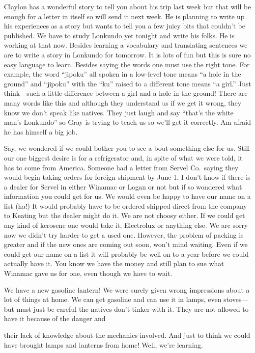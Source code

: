 \documentclass[
]{book}
\begin{document}
Claylon has a wonderful story to tell you about his trip last week but that will be enough for a letter in itself so will send it next week. He is planning to write up his experiences as a story but wants to tell you a few juicy bits that couldn't be published. We have to study Lonkundo yet tonight and write his folks. He is working at that now. Besides learning a vocabulary and translating sentences we are to write a story in Lonkundo for tomorrow. It is lots of fun but this is sure no easy language to learn. Besides saying the words one must use the right tone. For example, the word ``jipoku'' all spoken in a low-level tone means ``a hole in the ground'' and ``jipoku'' with the ``ku'' raised to a different tone means ``a girl.'' Just think---such a little difference between a girl and a hole in the ground! There are many words like this and although they understand us if we get it wrong, they know we don't speak like natives. They just laugh and say ``that's the white man's Lonkundo'' so Gray is trying to teach us so we'll get it correctly. Am afraid he has himself a big job.

Say, we wondered if we could bother you to see a bout something else for us. Still our one biggest desire is for a refrigerator and, in spite of what we were told, it has to come from America. Someone had a letter from Servel Co.~saying they would begin taking orders for foreign shipment by June 1. I don't know if there is a dealer for Servel in either Winamac or Logan or not but if so wondered what information you could get for us. We would even be happy to have our name on a list (ha!) It would probably have to be ordered shipped direct from the company to Keating but the dealer might do it. We are not choosy either. If we could get any kind of kerosene one would take it, Electrolux or anything else. We are sorry now we didn't try harder to get a used one. However, the problem of packing is greater and if the new ones are coming out soon, won't mind waiting. Even if we could get our name on a list it will probably be well on to a year before we could actually have it. You know we have the money and still plan to sue what Winamac gave us for one, even though we have to wait.

We have a new gasoline lantern! We were surely given wrong impressions about a lot of things at home. We can get gasoline and can use it in lamps, even stoves---but must just be careful the natives don't tinker with it. They are not allowed to have it because of the danger and

their lack of knowledge about the mechanics involved. And just to think we could have brought lamps and lanterns from home! Well, we're learning.
\end{document}
